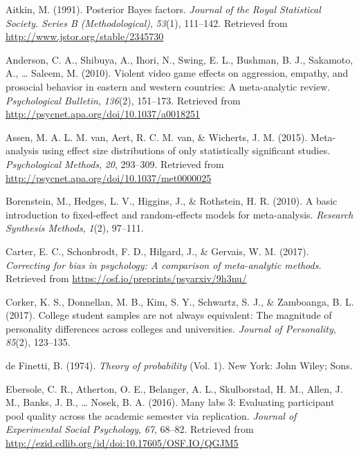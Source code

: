 \documentclass[english,man]{apa6}
\theoremstyle{definition}
\theoremstyle{definition}
\theoremstyle{remark}
\begin{document}
\hypertarget{refs}{}
\hypertarget{ref-Aitkin:1991}{}
Aitkin, M. (1991). Posterior Bayes factors. \emph{Journal of the Royal
Statistical Society. Series B (Methodological)}, \emph{53}(1), 111--142.
Retrieved from \url{http://www.jstor.org/stable/2345730}

\hypertarget{ref-Anderson:etal:2010}{}
Anderson, C. A., Shibuya, A., Ihori, N., Swing, E. L., Bushman, B. J.,
Sakamoto, A., \ldots{} Saleem, M. (2010). Violent video game effects on
aggression, empathy, and prosocial behavior in eastern and western
countries: A meta-analytic review. \emph{Psychological Bulletin},
\emph{136}(2), 151--173. Retrieved from
\url{http://psycnet.apa.org/doi/10.1037/a0018251}

\hypertarget{ref-vanAssen:etal:2015}{}
Assen, M. A. L. M. van, Aert, R. C. M. van, \& Wicherts, J. M. (2015).
Meta-analysis using effect size distributions of only statistically
significant studies. \emph{Psychological Methods}, \emph{20}, 293--309.
Retrieved from \url{http://psycnet.apa.org/doi/10.1037/met0000025}

\hypertarget{ref-Borenstein:etal:2010}{}
Borenstein, M., Hedges, L. V., Higgins, J., \& Rothstein, H. R. (2010).
A basic introduction to fixed-effect and random-effects models for
meta-analysis. \emph{Research Synthesis Methods}, \emph{1}(2), 97--111.

\hypertarget{ref-Carter:etal:2017}{}
Carter, E. C., Schonbrodt, F. D., Hilgard, J., \& Gervais, W. M. (2017).
\emph{Correcting for bias in psychology: A comparison of meta-analytic
methods.} Retrieved from \url{https://osf.io/preprints/psyarxiv/9h3nu/}

\hypertarget{ref-Corker:etal:2017}{}
Corker, K. S., Donnellan, M. B., Kim, S. Y., Schwartz, S. J., \&
Zamboanga, B. L. (2017). College student samples are not always
equivalent: The magnitude of personality differences across colleges and
universities. \emph{Journal of Personality}, \emph{85}(2), 123--135.

\hypertarget{ref-deFinetti:1974}{}
de Finetti, B. (1974). \emph{Theory of probability} (Vol. 1). New York:
John Wiley; Sons.

\hypertarget{ref-Ebersole:etal:2016}{}
Ebersole, C. R., Atherton, O. E., Belanger, A. L., Skulborstad, H. M.,
Allen, J. M., Banks, J. B., \ldots{} Nosek, B. A. (2016). Many labs 3:
Evaluating participant pool quality across the academic semester via
replication. \emph{Journal of Experimental Social Psychology},
\emph{67}, 68--82. Retrieved from
\url{http://ezid.cdlib.org/id/doi:10.17605/OSF.IO/QGJM5}
\end{document}

